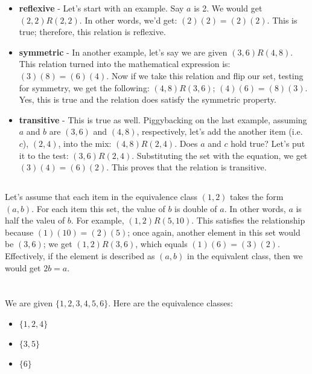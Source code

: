 \documentclass{article}
\begin{document}
\begin{itemize}

    \item \textbf{reflexive} - Let's start with an example. Say $a$ is 2.  We would get $(2,2)R(2,2)$. In other words, we'd get: $(2)(2) = (2)(2)$. This is true; therefore, this relation is reflexive.
    
    \item \textbf{symmetric} - In another example, let's say we are given $(3,6)R(4,8)$. This relation turned into the mathematical expression is: $(3)(8) = (6)(4)$. Now if we take this relation and flip our set, testing for symmetry, we get the following: $(4,8)R(3,6)$; $(4)(6) = (8)(3)$. Yes, this is true and the relation does satisfy the symmetric property. 
    \item \textbf{transitive} - This is true as well. Piggybacking on the last example, assuming $a$ and $b$ are $(3,6)$ and $(4,8)$, respectively, let's add the another item (i.e. $c$), $(2,4)$, into the mix: $(4,8)R(2,4)$. Does $a$ and $c$ hold true? Let's put it to the test: $(3,6)R(2,4)$. Substituting the set with the equation, we get $(3)(4) = (6)(2)$. This proves that the relation is transitive.
    
\end{itemize}

\subsection{}

Let's assume that each item in the equivalence class $(1,2)$ takes the form $(a,b)$. For each item this set, the value of $b$ is double of $a$. In other words, $a$ is half the valeu of $b$. For example, $(1,2)R(5,10)$. This satisfies the relationship because $(1)(10) = (2)(5)$; once again, another element in this set would be $(3,6)$; we get $(1,2)R(3,6)$, which equals $(1)(6) = (3)(2)$. Effectively, if the element is described as $(a,b)$ in the equivalent class, then we would get $2b = a$.

\section{}

We are given $\{1,2,3,4,5,6\}$. Here are the equivalence classes:
\begin{itemize}
\item $\{1,2,4\}$
\item $\{3, 5\}$
\item $\{6\}$
\end{itemize}
\end{document}
